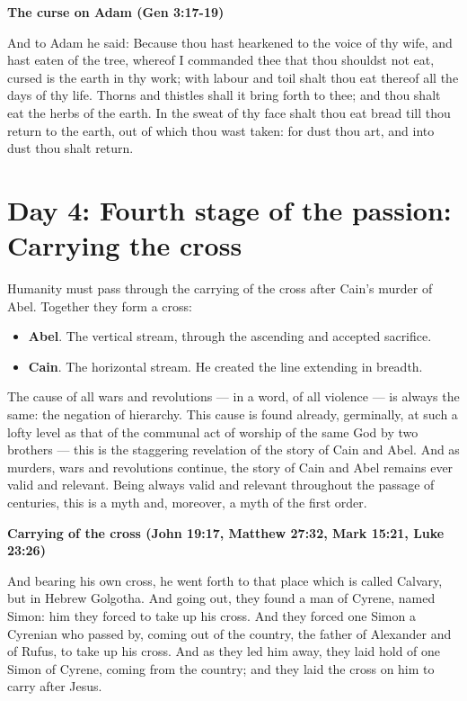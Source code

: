\textbf{The curse on Adam (Gen 3:17-19)}

And to Adam he said: Because thou hast hearkened to the voice of thy wife, and hast eaten of the tree, whereof I commanded thee that thou shouldst not eat, cursed is the earth in thy work; with labour and toil shalt thou eat thereof all the days of thy life. Thorns and thistles shall it bring forth to thee; and thou shalt eat the herbs of the earth. In the sweat of thy face shalt thou eat bread till thou return to the earth, out of which thou wast taken: for dust thou art, and into dust thou shalt return.

\section{Day 4: Fourth stage of the passion: Carrying the cross}

Humanity must pass through the carrying of the cross after Cain's murder of Abel. Together they form a cross:

\begin{itemize}
\item \textbf{Abel}. The vertical stream, through the ascending and accepted sacrifice. 
\item \textbf{Cain}. The horizontal stream. He created the line extending in breadth. 
\end{itemize}

\begin{quotex}
The cause of all wars and revolutions — in a word, of all violence — is always the same: the negation of hierarchy. This cause is found already, germinally, at such a lofty level as that of the communal act of worship of the same God by two brothers — this is the staggering revelation of the story of Cain and Abel. And as murders, wars and revolutions continue, the story of Cain and Abel remains ever valid and relevant. Being always valid and relevant throughout the passage of centuries, this is a myth and, moreover, a myth of the first order. 

\end{quotex}

\textbf{Carrying of the cross (John 19:17, Matthew 27:32, Mark 15:21, Luke 23:26)}

And bearing his own cross, he went forth to that place which is called Calvary, but in Hebrew Golgotha. And going out, they found a man of Cyrene, named Simon: him they forced to take up his cross. And they forced one Simon a Cyrenian who passed by, coming out of the country, the father of Alexander and of Rufus, to take up his cross. And as they led him away, they laid hold of one Simon of Cyrene, coming from the country; and they laid the cross on him to carry after Jesus.

